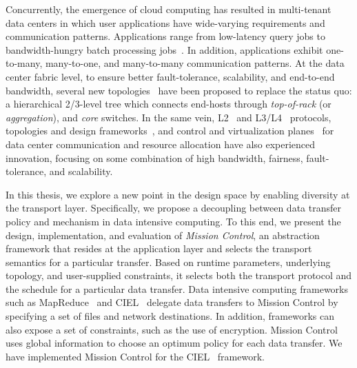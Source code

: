 \documentclass[a4paper,12pt,twoside,openright]{report}
\begin{document}
Concurrently, the emergence of cloud computing has resulted in multi-tenant data
centers in which user applications have wide-varying requirements and
communication patterns. Applications range from low-latency query jobs to
bandwidth-hungry batch processing jobs~\cite{Alizadeh:2010:DCT}. In addition,
applications exhibit one-to-many, many-to-one, and many-to-many communication
patterns. At the data center fabric level, to ensure better fault-tolerance,
scalability, and end-to-end bandwidth, several new
topologies~\cite{Al-Fares:2008:SCD,Guo:2008:DSF,Guo:2009:BHP,Greenberg:2009:VSF}
have been proposed to replace the status quo: a hierarchical 2/3-level tree
which connects end-hosts through \emph{top-of-rack} (or \emph{aggregation}), and
\emph{core} switches. In the same vein,
L2~\cite{Mudigonda:2010:SCD,Vattikonda:2012:PTD} and
L3/L4~\cite{Alizadeh:2010:DCT,Vasudevan:2009:SEF,Raiciu:2010:DCN,Wilson:2011:BNL,Wu:2010:IIC}
protocols, topologies and design
frameworks~\cite{Singla:2011:JND,Al-Fares:2008:SCD,Guo:2008:DSF,Guo:2009:BHP,Greenberg:2009:VSF,Mudigonda:2011:TFC,Chen:2010:GAA},
and control and virtualization
planes~\cite{NiranjanMysore:2009:PSF,Mudigonda:2011:NSM,Guo:2010:SDC,Ballani:2011:TPD,Shieh:2011:SDC,Rodrigues:2011:GSB,Al-Fares:2010:HDF}
for data center communication and resource allocation have also experienced
innovation, focusing on some combination of high bandwidth, fairness,
fault-tolerance, and scalability.

In this thesis, we explore a new point in the design space by enabling diversity
at the transport layer. Specifically, we propose a decoupling between data
transfer policy and mechanism in data intensive computing. To this end, we
present the design, implementation, and evaluation of \emph{Mission Control}, an
abstraction framework that resides at the application layer and selects the
transport semantics for a particular transfer. Based on runtime parameters,
underlying topology, and user-supplied constraints, it selects both the
transport protocol and the schedule for a particular data transfer.
Data intensive computing frameworks such as MapReduce~\cite{Dean:2004:MSD} and
CIEL~\cite{Murray:2011:CUE} delegate data transfers to Mission Control by
specifying a set of files and network destinations. In addition, frameworks can
also expose a set of constraints, such as the use of encryption. Mission Control
uses global information to choose an optimum policy for each data transfer. We
have implemented Mission Control for the CIEL~\cite{Murray:2011:CUE} framework.
\end{document}
